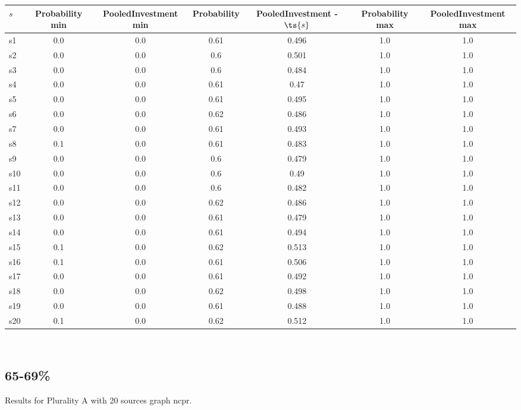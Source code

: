 \documentclass{article}
\begin{document}
\noindent\begin{tabular}{|l|c|c|c|c|c|c|}
\hline
$s$& Probability min & PooledInvestment min & Probability & PooledInvestment - $\ts{s}$ & Probability max & PooledInvestment max\\
\hline
s1 &0.0 & 0.0 & 0.61 & 0.496 & 1.0 & 1.0\\
\hline
s2 &0.0 & 0.0 & 0.6 & 0.501 & 1.0 & 1.0\\
\hline
s3 &0.0 & 0.0 & 0.6 & 0.484 & 1.0 & 1.0\\
\hline
s4 &0.0 & 0.0 & 0.61 & 0.47 & 1.0 & 1.0\\
\hline
s5 &0.0 & 0.0 & 0.61 & 0.495 & 1.0 & 1.0\\
\hline
s6 &0.0 & 0.0 & 0.62 & 0.486 & 1.0 & 1.0\\
\hline
s7 &0.0 & 0.0 & 0.61 & 0.493 & 1.0 & 1.0\\
\hline
s8 &0.1 & 0.0 & 0.61 & 0.483 & 1.0 & 1.0\\
\hline
s9 &0.0 & 0.0 & 0.6 & 0.479 & 1.0 & 1.0\\
\hline
s10 &0.0 & 0.0 & 0.6 & 0.49 & 1.0 & 1.0\\
\hline
s11 &0.0 & 0.0 & 0.6 & 0.482 & 1.0 & 1.0\\
\hline
s12 &0.0 & 0.0 & 0.62 & 0.486 & 1.0 & 1.0\\
\hline
s13 &0.0 & 0.0 & 0.61 & 0.479 & 1.0 & 1.0\\
\hline
s14 &0.0 & 0.0 & 0.61 & 0.494 & 1.0 & 1.0\\
\hline
s15 &0.1 & 0.0 & 0.62 & 0.513 & 1.0 & 1.0\\
\hline
s16 &0.1 & 0.0 & 0.61 & 0.506 & 1.0 & 1.0\\
\hline
s17 &0.0 & 0.0 & 0.61 & 0.492 & 1.0 & 1.0\\
\hline
s18 &0.0 & 0.0 & 0.62 & 0.498 & 1.0 & 1.0\\
\hline
s19 &0.0 & 0.0 & 0.61 & 0.488 & 1.0 & 1.0\\
\hline
s20 &0.1 & 0.0 & 0.62 & 0.512 & 1.0 & 1.0\\
\hline
\end{tabular}\\

\newpage

\subsection{65-69\%}

\noindent Results for Plurality A with 20 sources graph ncpr.
\end{document}
